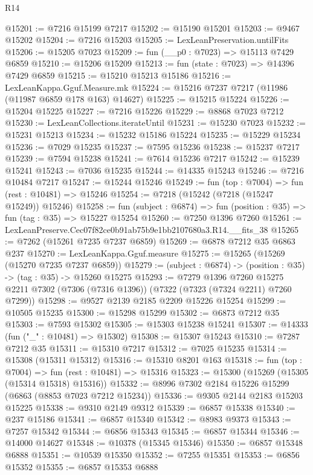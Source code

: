 \begin{lexlean}{R14}
\begin{coremodule}
@15201 := @7216 @15199 @7217
@15202 := @15190 @15201
@15203 := @9467 @15202
@15204 := @7216 @15203
@15205 := LexLeanPreservation.untilFits
@15206 := @15205 @7023
@15209 := fun (__p0 : @7023) => @15113 @7429 @6859
@15210 := @15206 @15209
@15213 := fun (state : @7023) => @14396 @7429 @6859
@15215 := @15210 @15213 @15186
@15216 := LexLeanKappa.Gguf.Measure.mk
@15224 := @15216 @7237 @7217 (@11986 (@11987 @6859 @178 @163) @14627)
@15225 := @15215 @15224
@15226 := @15204 @15225
@15227 := @7216 @15226
@15229 := @8868 @7023 @7212
@15230 := LexLeanCollections.iterateUntil
@15231 := @15230 @7023
@15232 := @15231 @15213
@15234 := @15232 @15186 @15224
@15235 := @15229 @15234
@15236 := @7029 @15235
@15237 := @7595 @15236
@15238 := @15237 @7217
@15239 := @7594 @15238
@15241 := @7614 @15236 @7217
@15242 := @15239 @15241
@15243 := @7036 @15235
@15244 := @14335 @15243
@15246 := @7216 @10484 @7217
@15247 := @15244 @15246
@15249 := fun (top : @7004) => fun (rest : @10481) => @15246
@15254 := @7218 (@15242 (@7218 (@15247 @15249)) @15246)
@15258 := fun (subject : @6874) => fun (position : @35) => fun (tag : @35) => @15227 @15254
@15260 := @7250 @1396 @7260
@15261 := LexLeanPreserve.Cec07f82ce0b91ab75b9e1bb2107680a3.R14.__fits_38
@15265 := @7262 (@15261 @7235 @7237 @6859)
@15269 := @6878 @7212 @35 @6863 @237
@15270 := LexLeanKappa.Gguf.measure
@15275 := @15265 (@15269 (@15270 @7235 @7237 @6859))
@15279 := (subject : @6874) -> (position : @35) -> (tag : @35) -> @15260 @15275
@15293 := @7279
    @1396
    @7260
    @15275
    @2211
    @7302
    (@7306 (@7316 @1396))
    (@7322 (@7323 (@7324 @2211) @7260 @7299))
@15298 := @9527 @2139 @2185 @2209 @15226 @15254
@15299 := @10505 @15235
@15300 := @15298 @15299
@15302 := @6873 @7212 @35
@15303 := @7593 @15302
@15305 := @15303 @15238 @15241
@15307 := @14333 (fun ("_" : @10481) => @15302)
@15308 := @15307 @15243
@15310 := @7287 @7212 @35
@15311 := @15310 @7217
@15312 := @7025 @15235
@15314 := @15308 (@15311 @15312)
@15316 := @15310 @8201 @163
@15318 := fun (top : @7004) => fun (rest : @10481) => @15316
@15323 := @15300 (@15269 (@15305 (@15314 @15318) @15316))
@15332 := @8996 @7302 @2184 @15226 @15299 (@6863 (@8853 @7023 @7212 @15234))
@15336 := @9305 @2144 @2183 @15203 @15225
@15338 := @9310 @2149 @9312
@15339 := @6857 @15338
@15340 := @237 @15186
@15341 := @6857 @15340
@15342 := @8983 @9373
@15343 := @7257 @15342
@15344 := @6856 @15343
@15345 := @6857 @15344
@15346 := @14000 @14627
@15348 := @10378 (@15345 @15346)
@15350 := @6857 @15348 @6888
@15351 := @10539 @15350
@15352 := @7255 @15351
@15353 := @6856 @15352
@15355 := @6857 @15353 @6888

\end{coremodule}
\end{lexlean}
